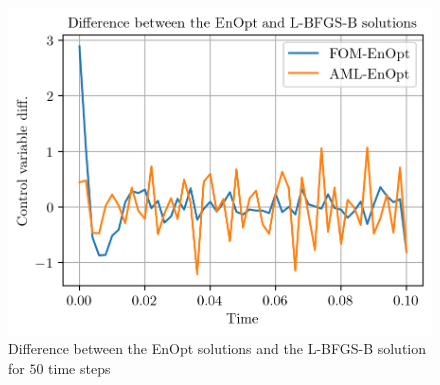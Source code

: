 \begin{figure}
\centering
\includegraphics{Plots/solutionsDifferLBFGSBNT50.png}
\caption{\label{solutionsDifferLBFGSBNT50}Difference between the EnOpt solutions and the L-BFGS-B solution for $50$ time steps}
\end{figure}